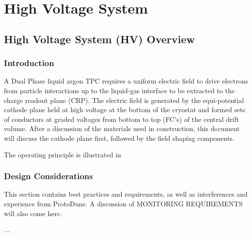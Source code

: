 \chapter{High Voltage System}
\label{ch:fddp-hv}

\section{High Voltage System (HV) Overview}
\label{sec:fddp-hv-ov}


\subsection{Introduction}
\label{sec:fddp-hv-intro}
A Dual Phase liquid argon TPC requires a uniform electric field to drive electrons from particle interactions up to the liquid-gas interface to be extracted to the charge readout plane (CRP).  The electric field is generated by the equi-potential cathode plane held at high voltage at the bottom of the cryostat and formed sets of conductors at graded voltages from bottom to top (FC's) of the central drift volume. After a discussion of the materials used in construction, this document will discuss the cathode plane first, followed by the field shaping components. 

The operating principle is illustrated in %


\subsection{Design Considerations}
\label{sec:fddp-hv-des-consid}
This section contains best practices and requirements, as well as interferences and experience from ProtoDune. A discussion of MONITORING REQUIREMENTS will also come here.

 
...


